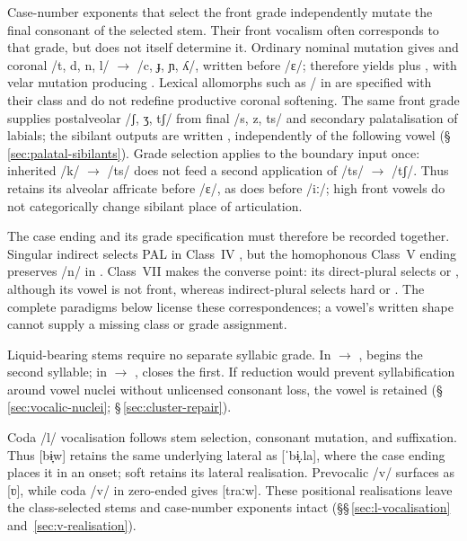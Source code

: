 Case-number exponents that select the front grade independently
mutate the final consonant of the selected stem. Their front vocalism often
corresponds to that grade, but does not itself determine it. Ordinary nominal
mutation gives  and coronal
/t, d, n, l/ $\rightarrow$ /c, ɟ, ɲ, ʎ/, written
 before /ɛ/;  therefore yields
 plus , with velar mutation producing .
Lexical allomorphs such as / in  are specified
with their class and do not redefine productive coronal softening. The same
front grade supplies postalveolar /ʃ, ʒ, tʃ/ from final /s, z, ts/ and
secondary palatalisation of labials; the sibilant outputs are written
, independently of the following vowel
(§\,\ref{sec:palatal-sibilants}). Grade selection applies to the boundary
input once: inherited /k/ $\rightarrow$ /ts/ does not feed a second application
of /ts/ $\rightarrow$ /tʃ/. Thus  retains its alveolar affricate
before /ɛ/, as does  before /iː/; high front vowels do not
categorically change sibilant place of articulation.

The case ending and its grade specification must therefore be recorded
together. Singular indirect  selects PAL in Class~IV ,
but the homophonous Class~V ending preserves /n/ in .
Class~VII makes the converse point: its direct-plural  selects
 or , although its vowel is not front, whereas
indirect-plural  selects hard  or .
The complete paradigms below license these correspondences; a vowel's written
shape cannot supply a missing class or grade assignment.

Liquid-bearing stems require no separate syllabic grade. In 
$\rightarrow$ ,  begins the second syllable; in
 $\rightarrow$ ,  closes the first.
If reduction would prevent syllabification around vowel nuclei without
unlicensed consonant loss, the vowel is retained
(§\,\ref{sec:vocalic-nuclei}; §\,\ref{sec:cluster-repair}).

Coda /l/ vocalisation follows stem selection, consonant mutation, and
suffixation. Thus  [bɨ̞w] retains the same underlying lateral as
 [ˈbɨ̞.la], where the case ending places it in an onset; soft
 retains its lateral realisation. Prevocalic /v/ surfaces as [ʋ],
while coda /v/ in zero-ended  gives [traːw]. These positional
realisations leave the class-selected stems and case-number exponents intact
(§§\,\ref{sec:l-vocalisation} and~\ref{sec:v-realisation}).

